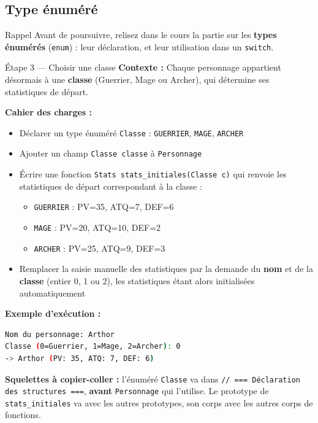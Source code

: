 \subsection{Type énuméré}

\begin{UPSTIinfor}{Rappel}
  Avant de poursuivre, relisez dans le cours la partie sur les \textbf{types énumérés}
  (\texttt{enum}) : leur déclaration, et leur utilisation dans un \texttt{switch}.
\end{UPSTIinfor}

\begin{UPSTIManipulation}{Étape 3 — Choisir une classe}
  \textbf{Contexte :} Chaque personnage appartient désormais à une \textbf{classe}
  (Guerrier, Mage ou Archer), qui détermine ses statistiques de départ.

  \textbf{Cahier des charges :}
  \begin{itemize}
    \item Déclarer un type énuméré \texttt{Classe} : \texttt{GUERRIER}, \texttt{MAGE},
      \texttt{ARCHER}
    \item Ajouter un champ \texttt{Classe classe} à \texttt{Personnage}
    \item Écrire une fonction \texttt{Stats stats\_initiales(Classe c)} qui renvoie les
      statistiques de départ correspondant à la classe :
      \begin{itemize}
        \item \texttt{GUERRIER} : PV=35, ATQ=7, DEF=6
        \item \texttt{MAGE} : PV=20, ATQ=10, DEF=2
        \item \texttt{ARCHER} : PV=25, ATQ=9, DEF=3
      \end{itemize}
    \item Remplacer la saisie manuelle des statistiques par la demande du \textbf{nom} et de la
      \textbf{classe} (entier 0, 1 ou 2), les statistiques étant alors initialisées
      automatiquement
  \end{itemize}

  \textbf{Exemple d'exécution :}
  \begin{lstlisting}[language=bash]
Nom du personnage: Arthor
Classe (0=Guerrier, 1=Mage, 2=Archer): 0
-> Arthor (PV: 35, ATQ: 7, DEF: 6)
  \end{lstlisting}

  \textbf{Squelettes à copier-coller :} l'énuméré \texttt{Classe} va dans
  \texttt{// === Déclaration des structures ===}, \textbf{avant} \texttt{Personnage} qui
  l'utilise. Le prototype de \texttt{stats\_initiales} va avec les autres prototypes, son corps
  avec les autres corps de fonctions.


\end{UPSTIManipulation}
